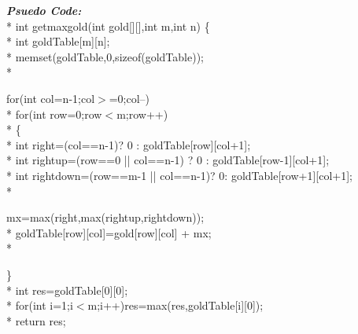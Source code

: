 \documentclass[12pt]{book}
\begin{document}
\textbf{\textit{Psuedo Code:}}\\*
int getmaxgold(int gold[][],int m,int n)
\{ \\*
\phantom{x} \hspace{3ex}    int goldTable[m][n];\\*
\phantom{x} \hspace{3ex}    memset(goldTable,0,sizeof(goldTable));\\*
    
\phantom{x} \hspace{3ex}    for(int col=n-1;col$>$=0;col--)\\*
\phantom{x} \hspace{3ex} \phantom{x} \hspace{3ex}       for(int row=0;row$<$m;row++)\\*
\phantom{x} \hspace{3ex} \phantom{x} \hspace{3ex}       \{ \\*
\phantom{x} \hspace{3ex} \phantom{x} \hspace{3ex} \phantom{x} \hspace{3ex}          int right=(col==n-1)? 0 : goldTable[row][col+1];\\*
\phantom{x} \hspace{3ex} \phantom{x} \hspace{3ex} \phantom{x} \hspace{3ex}          int rightup=(row==0 || col==n-1) ? 0 : goldTable[row-1][col+1];\\*
\phantom{x} \hspace{3ex} \phantom{x} \hspace{3ex} \phantom{x} \hspace{3ex}          int rightdown=(row==m-1 || col==n-1)? 0: goldTable[row+1][col+1];\\*

\phantom{x} \hspace{3ex} \phantom{x} \hspace{3ex} \phantom{x} \hspace{3ex}          mx=max(right,max(rightup,rightdown));\\*
\phantom{x} \hspace{3ex} \phantom{x} \hspace{3ex} \phantom{x} \hspace{3ex}          goldTable[row][col]=gold[row][col] + mx;\\*

\phantom{x} \hspace{3ex} \phantom{x} \hspace{3ex}       \} \\*
\phantom{x} \hspace{3ex}        int res=goldTable[0][0];\\*
\phantom{x} \hspace{3ex}        for(int i=1;i$<$m;i++)res=max(res,goldTable[i][0]);\\*
\phantom{x} \hspace{3ex}  return res;
\end{document}
